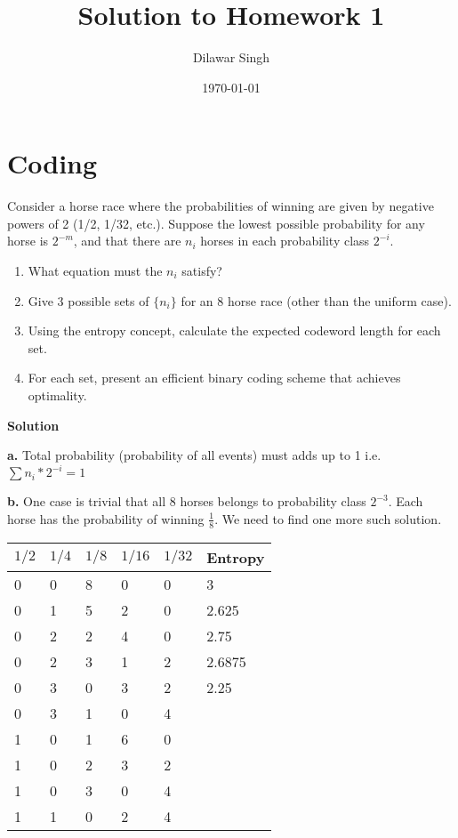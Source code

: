 \documentclass[]{article}
\title{Solution to Homework 1}
\author{Dilawar Singh}
\date{\today}
\providecommand{\tightlist}{%
\setlength{\itemsep}{0pt}\setlength{\parskip}{0pt}}
\begin{document}
\maketitle

\section{Coding}\label{coding}

Consider a horse race where the probabilities of winning are given by
negative powers of 2 (1/2, 1/32, etc.). Suppose the lowest possible
probability for any horse is \(2^{-m}\), and that there are \(n_i\)
horses in each probability class \(2^{-i}\).

\begin{enumerate}
\def\labelenumi{\alph{enumi}.}
\tightlist
\item
  What equation must the \(n_i\) satisfy?
\item
  Give 3 possible sets of \(\{n_i\}\) for an 8 horse race (other than
  the uniform case).
\item
  Using the entropy concept, calculate the expected codeword length for
  each set.
\item
  For each set, present an efficient binary coding scheme that achieves
  optimality.
\end{enumerate}

\textbf{Solution}

\textbf{a.} Total probability (probability of all events) must adds up
to 1 i.e. \(\sum n_i * 2^{-i} = 1\)

\textbf{b.} One case is trivial that all 8 horses belongs to probability
class \(2^{-3}\). Each horse has the probability of winning
\(\frac{1}{8}\). We need to find one more such solution.

\begin{longtable}[]{@{}llllll@{}}
\toprule
\(1/2\) & \(1/4\) & \(1/8\) & \(1/16\) & \(1/32\) &
Entropy\tabularnewline
\midrule
\endhead
0 & 0 & 8 & 0 & 0 & 3\tabularnewline
0 & 1 & 5 & 2 & 0 & 2.625\tabularnewline
0 & 2 & 2 & 4 & 0 & 2.75\tabularnewline
0 & 2 & 3 & 1 & 2 & 2.6875\tabularnewline
0 & 3 & 0 & 3 & 2 & 2.25\tabularnewline
0 & 3 & 1 & 0 & 4 &\tabularnewline
1 & 0 & 1 & 6 & 0 &\tabularnewline
1 & 0 & 2 & 3 & 2 &\tabularnewline
1 & 0 & 3 & 0 & 4 &\tabularnewline
1 & 1 & 0 & 2 & 4 &\tabularnewline
\bottomrule
\end{longtable}
\end{document}
